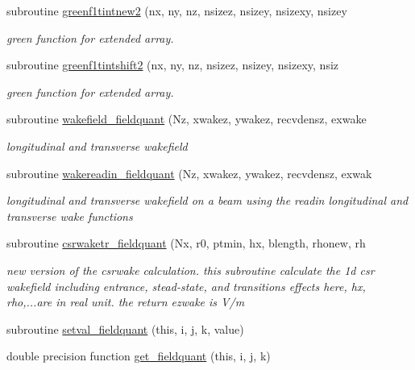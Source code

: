 \begin{DoxyCompactItemize}
subroutine \mbox{\hyperlink{namespacefieldquantclass_a32715398e47b9a73bd6cde1ae980e0a3}{greenf1tintnew2}} (nx, ny, nz, nsizez, nsizey, nsizexy, nsizey
\begin{DoxyCompactList}\small\item\em green function for extended array. \end{DoxyCompactList}\item 
subroutine \mbox{\hyperlink{namespacefieldquantclass_a25df6116d62bb56b5711333426dcd74d}{greenf1tintshift2}} (nx, ny, nz, nsizez, nsizey, nsizexy, nsiz
\begin{DoxyCompactList}\small\item\em green function for extended array. \end{DoxyCompactList}\item 
subroutine \mbox{\hyperlink{namespacefieldquantclass_a61fa5f8980736fbc19fa50224214727b}{wakefield\+\_\+fieldquant}} (Nz, xwakez, ywakez, recvdensz, exwake
\begin{DoxyCompactList}\small\item\em longitudinal and transverse wakefield \end{DoxyCompactList}\item 
subroutine \mbox{\hyperlink{namespacefieldquantclass_afc918d38222797f1f06903259e48461b}{wakereadin\+\_\+fieldquant}} (Nz, xwakez, ywakez, recvdensz, exwak
\begin{DoxyCompactList}\small\item\em longitudinal and transverse wakefield on a beam using the readin longitudinal and transverse wake functions \end{DoxyCompactList}\item 
subroutine \mbox{\hyperlink{namespacefieldquantclass_a773b62d57c290818337131902b979b43}{csrwaketr\+\_\+fieldquant}} (Nx, r0, ptmin, hx, blength, rhonew, rh
\begin{DoxyCompactList}\small\item\em new version of the csrwake calculation. this subroutine calculate the 1d csr wakefield including entrance, stead-\/state, and transitions effects here, hx, rho,...are in real unit. the return ezwake is V/m \end{DoxyCompactList}\item 
subroutine \mbox{\hyperlink{namespacefieldquantclass_a05318a0c571b3210e31af48028673474}{setval\+\_\+fieldquant}} (this, i, j, k, value)
\item 
double precision function \mbox{\hyperlink{namespacefieldquantclass_a5d4c07c22ffea0330d90b66e590b24a8}{get\+\_\+fieldquant}} (this, i, j, k)

\end{DoxyCompactItemize}
